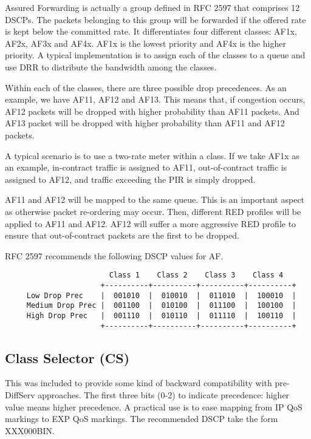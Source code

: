 Assured Forwarding is actually a group defined in RFC 2597 \cite{rfc2597} that comprises 12 DSCPs.
The packets belonging to this group will be forwarded if the offered rate is kept below the committed rate.
It differentiates four different classes: AF1x, AF2x, AF3x and AF4x.
AF1x is the lowest priority and AF4x is the higher priority.
A typical implementation is to assign each of the classes to a queue and use DRR to distribute the bandwidth among the classes.

Within each of the classes, there are three possible drop precedences.
As an example, we have AF11, AF12 and AF13.
This means that, if congestion occurs, AF12 packets will be dropped with higher probability than AF11 packets.
And AF13 packet will be dropped with higher probability than AF11 and AF12 packets.

A typical scenario is to use a two-rate meter within a class.
If we take AF1x as an example, in-contract traffic is assigned to AF11, out-of-contract traffic is assigned to AF12, and traffic exceeding the PIR is simply dropped.

AF11 and AF12 will be mapped to the same queue.
This is an important aspect as otherwise packet re-ordering may occur.
Then, different RED profiles will be applied to AF11 and AF12.
AF12 will suffer a more aggressive RED profile to ensure that out-of-contract packets are the first to be dropped.

RFC 2597 \cite{rfc2597} recommends the following DSCP values for AF.

{\scriptsize 
\begin{verbatim}
                        Class 1    Class 2    Class 3    Class 4
                      +----------+----------+----------+----------+
     Low Drop Prec    |  001010  |  010010  |  011010  |  100010  |
     Medium Drop Prec |  001100  |  010100  |  011100  |  100100  |
     High Drop Prec   |  001110  |  010110  |  011110  |  100110  |
                      +----------+----------+----------+----------+
\end{verbatim}
}

\subsection{Class Selector (CS)}
This was included to provide some kind of backward compatibility with pre-DiffServ approaches.
The first three bits (0-2) to indicate precedence: higher value means higher precedence.
A practical use is to ease mapping from IP QoS markings to EXP QoS markings.
The recommended DSCP take the form XXX000BIN.


